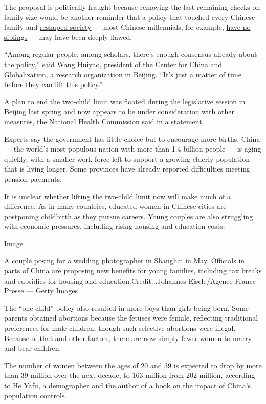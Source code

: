 The proposal is politically fraught because removing the last remaining
checks on family size would be another reminder that a policy that
touched every Chinese family and
\href{https://www.nytimes.com/2015/11/06/magazine/the-long-shadow-of-chinas-one-child-policy.html}{reshaped
society} --- most Chinese millennials, for example,
\href{https://www.nytimes.com/2015/11/14/world/asia/china-one-child-policy-loneliest-generation.html}{have
no siblings} --- may have been deeply flawed.

``Among regular people, among scholars, there's enough consensus already
about the policy,'' said Wang Huiyao, president of the Center for China
and Globalization, a research organization in Beijing. ``It's just a
matter of time before they can lift this policy.''

A plan to end the two-child limit was floated during the legislative
session in Beijing last spring and now appears to be under consideration
with other measures, the National Health Commission said in a statement.

Experts say the government has little choice but to encourage more
births. China --- the world's most populous nation with more than 1.4
billion people --- is aging quickly, with a smaller work force left to
support a growing elderly population that is living longer. Some
provinces have already reported difficulties meeting pension payments.

It is unclear whether lifting the two-child limit now will make much of
a difference. As in many countries, educated women in Chinese cities are
postponing childbirth as they pursue careers. Young couples are also
struggling with economic pressures, including rising housing and
education costs.

Image

A couple posing for a wedding photographer in Shanghai in May. Officials
in parts of China are proposing new benefits for young families,
including tax breaks and subsidies for housing and
education.Credit...Johannes Eisele/Agence France-Presse --- Getty Images

The ``one child'' policy also resulted in more boys than girls being
born. Some parents obtained abortions because the fetuses were female,
reflecting traditional preferences for male children, though such
selective abortions were illegal. Because of that and other factors,
there are now simply fewer women to marry and bear children.

The number of women between the ages of 20 and 39 is expected to drop by
more than 39 million over the next decade, to 163 million from 202
million, according to He Yafu, a demographer and the author of a book on
the impact of China's population controls.

